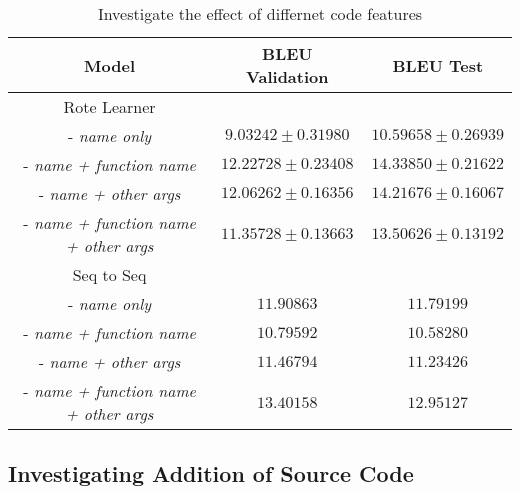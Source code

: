 \begin{table}[h!]
\begin{center}
\begin{tabular}{ c | c | c }
    Model                               & BLEU Validation            & BLEU Test  \\
    \hline
    \hline
    Rote Learner                        &                  & \\    
    - \textit{name only}                & $ 9.03242  \pm  0.31980 $ & $ 10.59658 \pm 0.26939 $  \\
    - \textit{name + function name}     & $ 12.22728 \pm  0.23408 $ & $ 14.33850 \pm 0.21622 $  \\
    - \textit{name + other args}        & $ 12.06262 \pm  0.16356 $ & $ 14.21676 \pm 0.16067 $  \\
    - \textit{name + function name + other args}  & $ 11.35728 \pm  0.13663 $ & $ 13.50626 \pm 0.13192 $ \\
    \hline
    \hline
    Seq to Seq                          &                  & \\
    - \textit{name only}                & $ 11.90863 $ & $ 11.79199 $ \\
    - \textit{name + function name}     & $ 10.79592 $ & $ 10.58280 $  \\
    - \textit{name + other args}        & $ 11.46794 $ & $ 11.23426 $ \\
    - \textit{name + function name + other args}   & $ 13.40158 $ & $ 12.95127 $ \\
    \hline
\end{tabular}
\caption {Investigate the effect of differnet code features}
\label{table:tokenization}
\end{center}
\end{table}




\subsection{Investigating Addition of Source Code} %
\label{subs:investigating_tokenizations_with_source_code}

